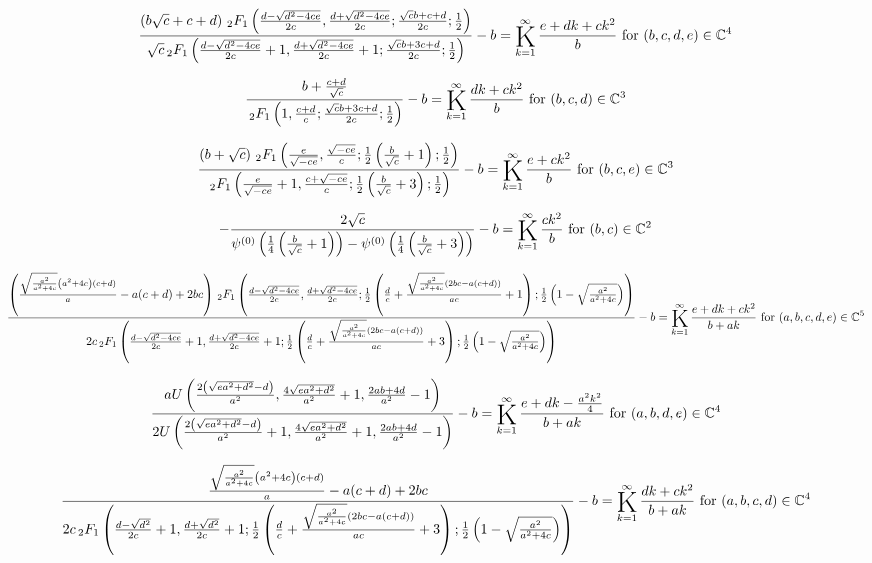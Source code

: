 \documentclass{article}
\newcommand{\bigK}{\mathop{\raisebox{-5pt}{\huge K}}}
\begin{document}
\[\frac{\left(b \sqrt{c}+c+d\right) \, _2F_1\left(\frac{d-\sqrt{d^2-4 c e}}{2 c},\frac{d+\sqrt{d^2-4 c e}}{2 c};\frac{\sqrt{c} b+c+d}{2 c};\frac{1}{2}\right)}{\sqrt{c} \, _2F_1\left(\frac{d-\sqrt{d^2-4 c e}}{2 c}+1,\frac{d+\sqrt{d^2-4 c e}}{2 c}+1;\frac{\sqrt{c} b+3 c+d}{2 c};\frac{1}{2}\right)}-b=\bigK_{k=1}^{\infty}\frac{e+d k+c k^2}{b}\text{ for }(b,c,d,e)\in \mathbb{C}^4\] 

\[\frac{b+\frac{c+d}{\sqrt{c}}}{\, _2F_1\left(1,\frac{c+d}{c};\frac{\sqrt{c} b+3 c+d}{2 c};\frac{1}{2}\right)}-b=\bigK_{k=1}^{\infty}\frac{d k+c k^2}{b}\text{ for }(b,c,d)\in \mathbb{C}^3\] 

\[\frac{\left(b+\sqrt{c}\right) \, _2F_1\left(\frac{e}{\sqrt{-c e}},\frac{\sqrt{-c e}}{c};\frac{1}{2} \left(\frac{b}{\sqrt{c}}+1\right);\frac{1}{2}\right)}{\, _2F_1\left(\frac{e}{\sqrt{-c e}}+1,\frac{c+\sqrt{-c e}}{c};\frac{1}{2} \left(\frac{b}{\sqrt{c}}+3\right);\frac{1}{2}\right)}-b=\bigK_{k=1}^{\infty}\frac{e+c k^2}{b}\text{ for }(b,c,e)\in \mathbb{C}^3\] 

\[-\frac{2 \sqrt{c}}{\psi ^{(0)}\left(\frac{1}{4} \left(\frac{b}{\sqrt{c}}+1\right)\right)-\psi ^{(0)}\left(\frac{1}{4} \left(\frac{b}{\sqrt{c}}+3\right)\right)}-b=\bigK_{k=1}^{\infty}\frac{c k^2}{b}\text{ for }(b,c)\in \mathbb{C}^2\] 

\[\frac{\left(\frac{\sqrt{\frac{a^2}{a^2+4 c}} \left(a^2+4 c\right) (c+d)}{a}-a (c+d)+2 b c\right) \, _2F_1\left(\frac{d-\sqrt{d^2-4 c e}}{2 c},\frac{d+\sqrt{d^2-4 c e}}{2 c};\frac{1}{2} \left(\frac{d}{c}+\frac{\sqrt{\frac{a^2}{a^2+4 c}} (2 b c-a (c+d))}{a c}+1\right);\frac{1}{2} \left(1-\sqrt{\frac{a^2}{a^2+4 c}}\right)\right)}{2 c \, _2F_1\left(\frac{d-\sqrt{d^2-4 c e}}{2 c}+1,\frac{d+\sqrt{d^2-4 c e}}{2 c}+1;\frac{1}{2} \left(\frac{d}{c}+\frac{\sqrt{\frac{a^2}{a^2+4 c}} (2 b c-a (c+d))}{a c}+3\right);\frac{1}{2} \left(1-\sqrt{\frac{a^2}{a^2+4 c}}\right)\right)}-b=\bigK_{k=1}^{\infty}\frac{e+d k+c k^2}{b+a k}\text{ for }(a,b,c,d,e)\in \mathbb{C}^5\] 

\[\frac{a U\left(\frac{2 \left(\sqrt{e a^2+d^2}-d\right)}{a^2},\frac{4 \sqrt{e a^2+d^2}}{a^2}+1,\frac{2 a b+4 d}{a^2}-1\right)}{2 U\left(\frac{2 \left(\sqrt{e a^2+d^2}-d\right)}{a^2}+1,\frac{4 \sqrt{e a^2+d^2}}{a^2}+1,\frac{2 a b+4 d}{a^2}-1\right)}-b=\bigK_{k=1}^{\infty}\frac{e+d k-\frac{a^2 k^2}{4}}{b+a k}\text{ for }(a,b,d,e)\in \mathbb{C}^4\] 

\[\frac{\frac{\sqrt{\frac{a^2}{a^2+4 c}} \left(a^2+4 c\right) (c+d)}{a}-a (c+d)+2 b c}{2 c \, _2F_1\left(\frac{d-\sqrt{d^2}}{2 c}+1,\frac{d+\sqrt{d^2}}{2 c}+1;\frac{1}{2} \left(\frac{d}{c}+\frac{\sqrt{\frac{a^2}{a^2+4 c}} (2 b c-a (c+d))}{a c}+3\right);\frac{1}{2} \left(1-\sqrt{\frac{a^2}{a^2+4 c}}\right)\right)}-b=\bigK_{k=1}^{\infty}\frac{d k+c k^2}{b+a k}\text{ for }(a,b,c,d)\in \mathbb{C}^4\] 
\end{document}
